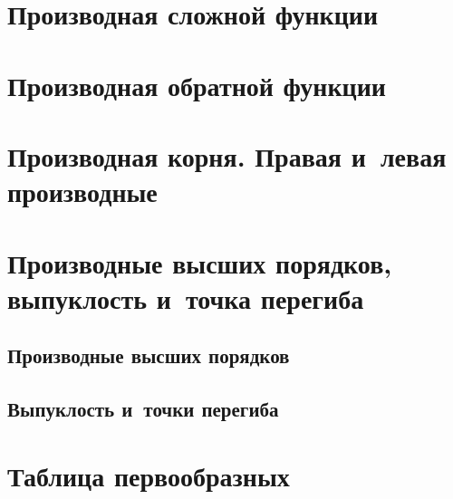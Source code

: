 \documentclass[14pt, oneside]{extbook}
\begin{document}
\section{Производная сложной функции}

\section{Производная обратной функции}

\section{Производная корня. Правая и~левая производные}

\section{Производные высших порядков, выпуклость и~точка перегиба}
\subsection{Производные высших порядков}

\subsection{Выпуклость и~точки перегиба}

\section{Таблица первообразных}

\end{document}
